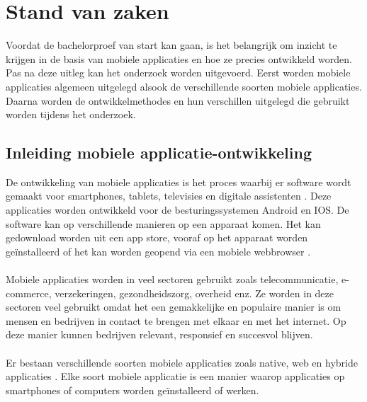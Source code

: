 \chapter{Stand van zaken}
\label{ch:stand-van-zaken}




Voordat de bachelorproef van start kan gaan, is het belangrijk om inzicht te 
krijgen in de basis van mobiele applicaties en hoe ze precies ontwikkeld worden. 
Pas na deze uitleg kan het onderzoek worden uitgevoerd. Eerst worden mobiele applicaties 
algemeen uitgelegd alsook de verschillende soorten mobiele applicaties. 
Daarna worden de ontwikkelmethodes en hun verschillen uitgelegd die gebruikt worden tijdens het 
onderzoek.

\section{Inleiding mobiele applicatie-ontwikkeling}

De ontwikkeling van mobiele applicaties is het proces waarbij er software wordt 
gemaakt voor smartphones, tablets, televisies en digitale assistenten \autocite{Palko2021}. 
Deze applicaties worden ontwikkeld voor de besturingssystemen Android en IOS. 
De software kan op verschillende manieren op een apparaat komen. Het kan gedownload 
worden uit een app store, vooraf op het apparaat worden geïnstalleerd of het kan worden 
geopend via een mobiele webbrowser \autocite{IBM2023}. 
\\\\
Mobiele applicaties worden in veel sectoren gebruikt zoals telecommunicatie, 
e-commerce, verzekeringen, gezondheidszorg, overheid enz. Ze worden in deze sectoren 
veel gebruikt omdat het een gemakkelijke en populaire manier is om mensen en bedrijven in contact te brengen 
met elkaar en met het internet. Op deze manier kunnen bedrijven relevant, responsief 
en succesvol blijven. 
\\\\
Er bestaan verschillende soorten mobiele applicaties zoals native, web en hybride 
applicaties \autocite{AWS2023}. Elke soort mobiele applicatie is een manier waarop  
applicaties op smartphones of computers worden geïnstalleerd of werken.

